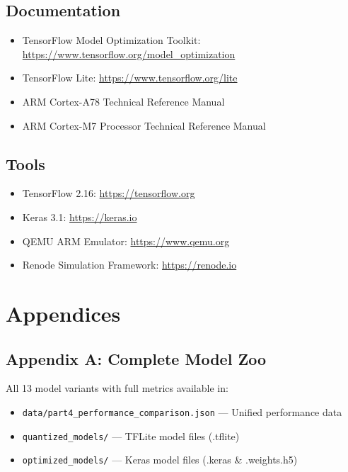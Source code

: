 \documentclass[10pt, a4paper]{article}
\begin{document}
\subsection*{Documentation}
\begin{itemize}
    \item TensorFlow Model Optimization Toolkit: \url{https://www.tensorflow.org/model_optimization}
    \item TensorFlow Lite: \url{https://www.tensorflow.org/lite}
    \item ARM Cortex-A78 Technical Reference Manual
    \item ARM Cortex-M7 Processor Technical Reference Manual
\end{itemize}

\subsection*{Tools}
\begin{itemize}
    \item TensorFlow 2.16: \url{https://tensorflow.org}
    \item Keras 3.1: \url{https://keras.io}
    \item QEMU ARM Emulator: \url{https://www.qemu.org}
    \item Renode Simulation Framework: \url{https://renode.io}
\end{itemize}

\section*{Appendices}

\subsection*{Appendix A: Complete Model Zoo}

All 13 model variants with full metrics available in:
\begin{itemize}
    \item \texttt{data/part4\_performance\_comparison.json} — Unified performance data
    \item \texttt{quantized\_models/} — TFLite model files (.tflite)
    \item \texttt{optimized\_models/} — Keras model files (.keras \& .weights.h5)
\end{itemize}

\end{document}
